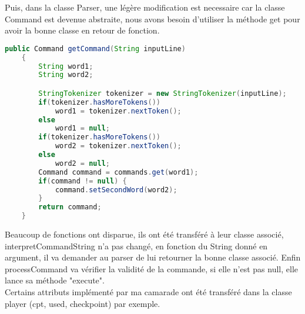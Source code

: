 \documentclass[a4paper , 10pt]{article}
\begin{document}
Puis, dans la classe Parser, une légère modification est necessaire car la classe Command est devenue abstraite, nous avons besoin d'utiliser la méthode get pour avoir la bonne classe en retour de fonction.

\begin{lstlisting}[language=Java, caption={Parser}]
    public Command getCommand(String inputLine) 
    {
        String word1;
        String word2;

        StringTokenizer tokenizer = new StringTokenizer(inputLine);
        if(tokenizer.hasMoreTokens())
            word1 = tokenizer.nextToken();  
        else
            word1 = null;
        if(tokenizer.hasMoreTokens())
            word2 = tokenizer.nextToken();     
        else
            word2 = null;
        Command command = commands.get(word1);
        if(command != null) {
            command.setSecondWord(word2);
        }
        return command;
    }   

\end{lstlisting}

Beaucoup de fonctions ont disparue, ils ont été transféré à leur classe associé, interpretCommandString n'a pas changé, en fonction du String donné en argument, 
il va demander au parser de lui retourner la bonne classe associé. Enfin processCommand va vérifier la validité de la commande, si elle n'est pas null, elle lance sa méthode "execute".\\
Certains attributs implémenté par ma camarade ont été transféré dans la classe player (cpt, used, checkpoint) par exemple.
\end{document}
